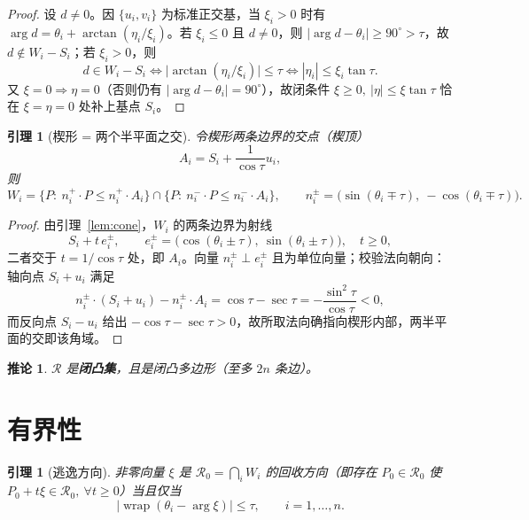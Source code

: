 \documentclass[11pt,a4paper]{ctexart}
\newtheorem{lemma}[theorem]{引理}
\newtheorem{corollary}[theorem]{推论}
\theoremstyle{definition}
\theoremstyle{remark}
\newcommand{\argvec}{\arg}
\newcommand{\wrap}{\operatorname{wrap}}
\begin{document}
\begin{proof}
设 $d\neq0$。因 $\{u_i,v_i\}$ 为标准正交基，当 $\xi_i>0$ 时有
$\argvec d=\theta_i+\arctan(\eta_i/\xi_i)$。若 $\xi_i\le0$ 且 $d\neq0$，则
$\lvert\argvec d-\theta_i\rvert\ge90^\circ>\tau$，故 $d\notin W_i-S_i$；若 $\xi_i>0$，则
\[
d\in W_i-S_i\iff\bigl|\arctan(\eta_i/\xi_i)\bigr|\le\tau
\iff|\eta_i|\le\xi_i\tan\tau .
\]
又 $\xi=0\Rightarrow\eta=0$（否则仍有 $\lvert\argvec d-\theta_i\rvert=90^\circ$），故闭条件
$\xi\ge0,\ |\eta|\le\xi\tan\tau$ 恰在 $\xi=\eta=0$ 处补上基点 $S_i$。
\end{proof}

\begin{lemma}[楔形 = 两个半平面之交]\label{lem:halfplane}
令楔形两条边界的交点（楔顶）
\begin{equation}
A_i=S_i+\frac{1}{\cos\tau}u_i,
\end{equation}
则
\begin{equation}
W_i=\bigl\{P:\ n_i^{+}\!\cdot P\le n_i^{+}\!\cdot A_i\bigr\}
\cap\bigl\{P:\ n_i^{-}\!\cdot P\le n_i^{-}\!\cdot A_i\bigr\},
\qquad
n_i^{\pm}=\bigl(\sin(\theta_i\mp\tau),\ -\cos(\theta_i\mp\tau)\bigr).
\tag{2}
\end{equation}
\end{lemma}

\begin{proof}
由引理~\ref{lem:cone}，$W_i$ 的两条边界为射线
\[
S_i+t\,e_i^{\pm},\qquad e_i^{\pm}=\bigl(\cos(\theta_i\pm\tau),\ \sin(\theta_i\pm\tau)\bigr),\quad t\ge0,
\]
二者交于 $t=1/\cos\tau$ 处，即 $A_i$。向量 $n_i^{\pm}\perp e_i^{\pm}$ 且为单位向量；校验法向朝向：
轴向点 $S_i+u_i$ 满足
\[
n_i^{\pm}\!\cdot(S_i+u_i)-n_i^{\pm}\!\cdot A_i
=\cos\tau-\sec\tau=-\frac{\sin^2\tau}{\cos\tau}<0,
\]
而反向点 $S_i-u_i$ 给出 $-\cos\tau-\sec\tau>0$，故所取法向确指向楔形内部，两半平面的交即该角域。
\end{proof}

\begin{corollary}
$\mathcal R$ 是\textbf{闭凸集}，且是闭凸多边形（至多 $2n$ 条边）。
\end{corollary}

\section{有界性}

\begin{lemma}[逃逸方向]\label{lem:recession}
非零向量 $\xi$ 是 $\mathcal R_0=\bigcap_iW_i$ 的回收方向（即存在 $P_0\in\mathcal R_0$ 使
$P_0+t\xi\in\mathcal R_0,\ \forall t\ge0$）当且仅当
\begin{equation}
\bigl|\wrap(\theta_i-\argvec\xi)\bigr|\le\tau,\qquad i=1,\dots,n .
\tag{3}
\end{equation}
\end{lemma}
\end{document}
